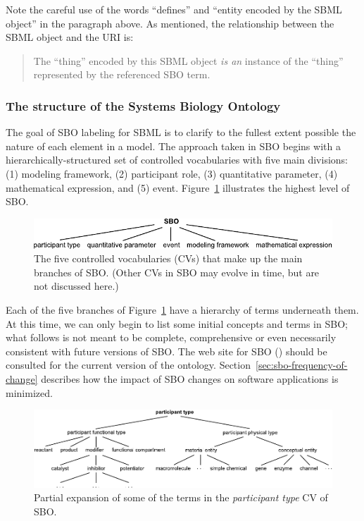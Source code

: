 Note the careful use of the words ``defines'' and ``entity encoded
by the SBML object'' in the paragraph above.  As mentioned, the
relationship between the SBML object and the URI is:
\begin{quote}
  The ``thing'' encoded by this SBML object \emph{is an} instance
  of the ``thing'' represented by the referenced SBO term.
\end{quote}


\subsubsection{The structure of the Systems Biology Ontology}

The goal of SBO labeling for SBML is to clarify to the fullest
extent possible the nature of each element in a
model.  The approach taken in SBO begins with a
hierarchically-structured set of controlled vocabularies with five
main divisions: (1) modeling framework, (2) participant role, (3)
quantitative parameter, (4) mathematical expression, and (5) event.
Figure~\ref{fig:sbo-top-level} illustrates the highest level of
SBO.

\begin{figure}[tbh]
  \vspace*{1ex}
  \centering
  \includegraphics[scale = 0.9]{figs/sbo-top-level}
  \caption{The five controlled vocabularies (CVs) that make up the
    main branches of SBO.  (Other CVs in SBO may evolve in time,
    but are not discussed here.)}
  \label{fig:sbo-top-level}
\end{figure}

Each of the five branches of Figure~\ref{fig:sbo-top-level} have a
hierarchy of terms underneath them.  At this time, we can only
begin to list some initial concepts and terms in SBO; what follows
is not meant to be complete, comprehensive or even necessarily
consistent with future versions of SBO.  The web site for SBO
(\sboref) should be consulted for the current version of the
ontology.  Section~\ref{sec:sbo-frequency-of-change} describes how
the impact of SBO changes on software applications is minimized.

\begin{figure}[htb]
  \vspace*{1ex}
  \centering
  \includegraphics[scale = 0.9]{figs/sbo-participant-type}
  \caption{Partial expansion of some of the terms in the
    \emph{participant type} CV of SBO.}
  \label{fig:expanded-species}
\end{figure}

